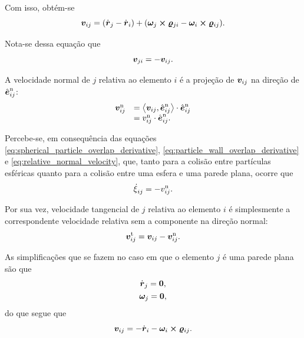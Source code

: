 Com isso, obtém-se
\begin{equation*}
	\relativeVelocityContactPointij = \pqty{\velocityj - \velocityi} + \pqty{\angularVelocityj\cross\contactVectorji - \angularVelocityi\cross\contactVectorij}.
\end{equation*}

Nota-se dessa equação que
\begin{equation} \label{eq:antisymmetry_relative_velocity}
	{\bm{v}}_{j i} = - {\bm{v}}_{i j}.
\end{equation}

A velocidade normal de \(j\) relativa ao elemento \(i\) é a projeção de \({\bm{v}}_{i j}\) na direção de \({\hat{\bm{e}}}_{i j}^{\text{n}}\):
\begin{equation} \label{eq:relative_normal_velocity}
	\begin{array}{rl}
		{\bm{v}}_{i j}^{\text{n}} & = \left\langle {\bm{v}}_{i j}, {\hat{\bm{e}}}_{i j}^{\text{n}} \right\rangle\cdot{\hat{\bm{e}}}_{i j}^{\text{n}} \\
		& = {v}_{i j}^{\text{n}}\cdot{\hat{\bm{e}}}_{i j}^{\text{n}}.
	\end{array}
\end{equation}

Percebe-se, em consequência das equações \eqref{eq:spherical_particle_overlap_derivative}, \eqref{eq:particle_wall_overlap_derivative} e \eqref{eq:relative_normal_velocity}, que, tanto para a colisão entre partículas esféricas quanto para a colisão entre uma esfera e uma parede plana, ocorre que
\begin{equation} \label{eq:overlap_derivative_and_normal_relative_velocity}
	\overlapDerivativeij = - \relativeNormalVelocityScalarij.
\end{equation}

Por sua vez, velocidade tangencial de \(j\) relativa ao elemento \(i\) é simplesmente a correspondente velocidade relativa sem a componente na direção normal:
\begin{equation*}
	{\bm{v}}_{i j}^{\text{t}} = {\bm{v}}_{i j} - {\bm{v}}_{i j}^{\text{n}}.
\end{equation*}

As simplificações que se fazem no caso em que o elemento \(j\) é uma parede plana são que 
\begin{gather*}
	\velocityj = \nullVector, \\
	\angularVelocityj = \nullVector,
\end{gather*}
do que segue que
\begin{equation} \label{eq:sphere_plane_relative_velocity}
	\relativeVelocityContactPointij = - \velocityi - \angularVelocityi\cross\contactVectorij.
\end{equation}

